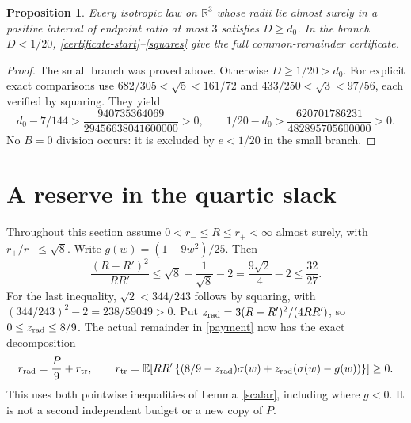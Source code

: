 \documentclass[11pt]{article}
\newtheorem{proposition}[theorem]{Proposition}
\theoremstyle{remark}\newtheorem{remark}[theorem]{Remark}
\newcommand{\E}{\mathbb E}
\newcommand{\R}{\mathbb R}
\numberwithin{equation}{section}
\begin{document}
\begin{proposition}\label{conditional-law}
Every isotropic law on $\R^3$ whose radii lie almost surely in a positive
interval of endpoint ratio at most $3$ satisfies $D\ge d_0$.
In the branch $D<1/20$, \eqref{certificate-start}--\eqref{squares}
give the full common-remainder certificate.
\end{proposition}
\begin{proof}
The small branch was proved above. Otherwise $D\ge1/20>d_0$.
For explicit exact comparisons use
$682/305<\sqrt5<161/72$ and $433/250<\sqrt3<97/56$,
each verified by squaring. They yield
\[
 d_0-7/144>\frac{940735364069}{29456638041600000}>0,\qquad
 1/20-d_0>\frac{620701786231}{482895705600000}>0.
\]
No $B=0$ division occurs: it is excluded by $e<1/20$ in the small branch.
\end{proof}

\section{A reserve in the quartic slack}\label{sec-reserve}
Throughout this section assume $0<r_-\le R\le r_+<\infty$ almost surely,
with $r_+/r_-\le\sqrt8$. Write $g(w)=(1-9w^2)/25$. Then
\[
 \frac{(R-R')^2}{RR'}\le\sqrt8+\frac1{\sqrt8}-2
    =\frac{9\sqrt2}{4}-2\le\frac{32}{27}.
\]
For the last inequality, $\sqrt2<344/243$ follows by squaring, with
$(344/243)^2-2=238/59049>0$. Put
$z_{\rm rad}=3(R-R')^2/(4RR')$, so $0\le z_{\rm rad}\le8/9$.
The actual remainder in \eqref{payment} now has the exact decomposition
\begin{equation}\label{reserve}
 r_{\rm rad}=\frac P9+r_{\rm tr},\qquad
 r_{\rm tr}=\E\!\left[RR'\left\{(8/9-z_{\rm rad})\sigma(w)
                    +z_{\rm rad}(\sigma(w)-g(w))\right\}\right]\ge0.
\end{equation}
This uses both pointwise inequalities of Lemma~\ref{scalar}, including
where $g<0$. It is not a second independent budget or a new copy of $P$.
\end{document}
